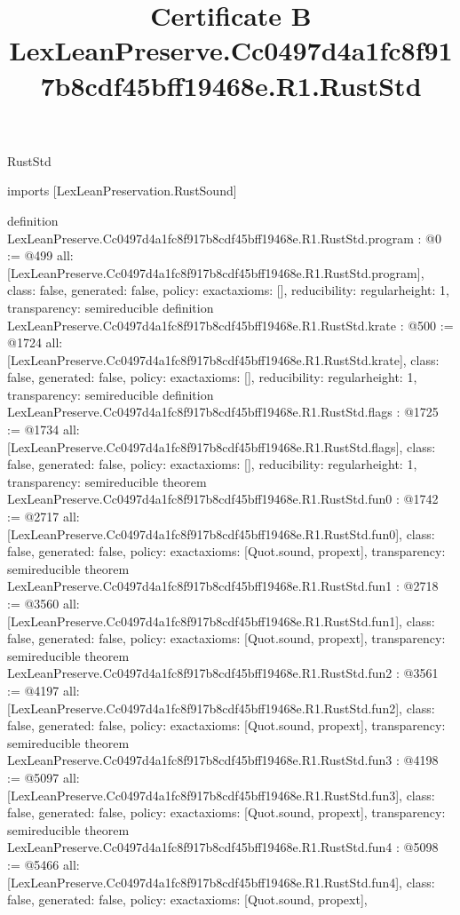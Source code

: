 \begin{lexlean}{RustStd}
\title{Certificate B LexLeanPreserve.Cc0497d4a1fc8f917b8cdf45bff19468e.R1.RustStd}
\begin{coremodule}
imports [LexLeanPreservation.RustSound]

definition LexLeanPreserve.Cc0497d4a1fc8f917b8cdf45bff19468e.R1.RustStd.program : @0 := @499 {
  all: [LexLeanPreserve.Cc0497d4a1fc8f917b8cdf45bff19468e.R1.RustStd.program],
  class: false,
  generated: false,
  policy: exact{axioms: []},
  reducibility: regular{height: 1},
  transparency: semireducible
}
definition LexLeanPreserve.Cc0497d4a1fc8f917b8cdf45bff19468e.R1.RustStd.krate : @500 := @1724 {
  all: [LexLeanPreserve.Cc0497d4a1fc8f917b8cdf45bff19468e.R1.RustStd.krate],
  class: false,
  generated: false,
  policy: exact{axioms: []},
  reducibility: regular{height: 1},
  transparency: semireducible
}
definition LexLeanPreserve.Cc0497d4a1fc8f917b8cdf45bff19468e.R1.RustStd.flags : @1725 := @1734 {
  all: [LexLeanPreserve.Cc0497d4a1fc8f917b8cdf45bff19468e.R1.RustStd.flags],
  class: false,
  generated: false,
  policy: exact{axioms: []},
  reducibility: regular{height: 1},
  transparency: semireducible
}
theorem LexLeanPreserve.Cc0497d4a1fc8f917b8cdf45bff19468e.R1.RustStd.fun0 : @1742 := @2717 {
  all: [LexLeanPreserve.Cc0497d4a1fc8f917b8cdf45bff19468e.R1.RustStd.fun0],
  class: false,
  generated: false,
  policy: exact{axioms: [Quot.sound, propext]},
  transparency: semireducible
}
theorem LexLeanPreserve.Cc0497d4a1fc8f917b8cdf45bff19468e.R1.RustStd.fun1 : @2718 := @3560 {
  all: [LexLeanPreserve.Cc0497d4a1fc8f917b8cdf45bff19468e.R1.RustStd.fun1],
  class: false,
  generated: false,
  policy: exact{axioms: [Quot.sound, propext]},
  transparency: semireducible
}
theorem LexLeanPreserve.Cc0497d4a1fc8f917b8cdf45bff19468e.R1.RustStd.fun2 : @3561 := @4197 {
  all: [LexLeanPreserve.Cc0497d4a1fc8f917b8cdf45bff19468e.R1.RustStd.fun2],
  class: false,
  generated: false,
  policy: exact{axioms: [Quot.sound, propext]},
  transparency: semireducible
}
theorem LexLeanPreserve.Cc0497d4a1fc8f917b8cdf45bff19468e.R1.RustStd.fun3 : @4198 := @5097 {
  all: [LexLeanPreserve.Cc0497d4a1fc8f917b8cdf45bff19468e.R1.RustStd.fun3],
  class: false,
  generated: false,
  policy: exact{axioms: [Quot.sound, propext]},
  transparency: semireducible
}
theorem LexLeanPreserve.Cc0497d4a1fc8f917b8cdf45bff19468e.R1.RustStd.fun4 : @5098 := @5466 {
  all: [LexLeanPreserve.Cc0497d4a1fc8f917b8cdf45bff19468e.R1.RustStd.fun4],
  class: false,
  generated: false,
  policy: exact{axioms: [Quot.sound, propext]},
}
\end{coremodule}
\end{lexlean}
